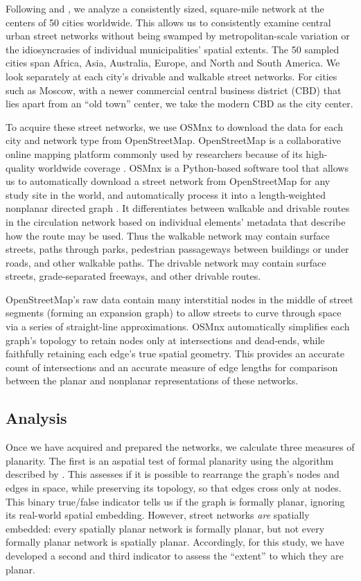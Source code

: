 \documentclass[Afour,sageh,times]{sagej}
\begin{document}
Following \citet{jacobs_great_1995} and \citet{cardillo_structural_2006}, we analyze a consistently sized, square-mile network at the centers of 50 cities worldwide. This allows us to consistently examine central urban street networks without being swamped by metropolitan-scale variation or the idiosyncrasies of individual municipalities' spatial extents. The 50 sampled cities span Africa, Asia, Australia, Europe, and North and South America. We look separately at each city's drivable and walkable street networks. For cities such as Moscow, with a newer commercial central business district (CBD) that lies apart from an \enquote{old town} center, we take the modern CBD as the city center.

To acquire these street networks, we use OSMnx to download the data for each city and network type from OpenStreetMap. OpenStreetMap is a collaborative online mapping platform commonly used by researchers because of its high-quality worldwide coverage \citep{haklay_how_2010,jokar_arsanjani_openstreetmap_2015}. OSMnx is a Python-based software tool that allows us to automatically download a street network from OpenStreetMap for any study site in the world, and automatically process it into a length-weighted nonplanar directed graph \citep{boeing_osmnx:_2017}. It differentiates between walkable and drivable routes in the circulation network based on individual elements' metadata that describe how the route may be used. Thus the walkable network may contain surface streets, paths through parks, pedestrian passageways between buildings or under roads, and other walkable paths. The drivable network may contain surface streets, grade-separated freeways, and other drivable routes.

OpenStreetMap's raw data contain many interstitial nodes in the middle of street segments (forming an expansion graph) to allow streets to curve through space via a series of straight-line approximations. OSMnx automatically simplifies each graph's topology to retain nodes only at intersections and dead-ends, while faithfully retaining each edge's true spatial geometry. This provides an accurate count of intersections and an accurate measure of edge lengths for comparison between the planar and nonplanar representations of these networks.

\subsection{Analysis}

Once we have acquired and prepared the networks, we calculate three measures of planarity. The first is an aspatial test of formal planarity using the algorithm described by \citet{boyer_subgraph_2012}. This assesses if it is possible to rearrange the graph's nodes and edges in space, while preserving its topology, so that edges cross only at nodes. This binary true/false indicator tells us if the graph is formally planar, ignoring its real-world spatial embedding. However, street networks \emph{are} spatially embedded: every spatially planar network is formally planar, but not every formally planar network is spatially planar. Accordingly, for this study, we have developed a second and third indicator to assess the \enquote{extent} to which they are planar.
\end{document}
